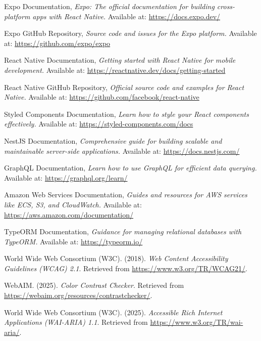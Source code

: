\begin{thebibliography}{99}

Expo Documentation,  
\textit{Expo: The official documentation for building cross-platform apps with React Native.}  
Available at: \url{https://docs.expo.dev/}

Expo GitHub Repository,  
\textit{Source code and issues for the Expo platform.}  
Available at: \url{https://github.com/expo/expo}

React Native Documentation,  
\textit{Getting started with React Native for mobile development.}  
Available at: \url{https://reactnative.dev/docs/getting-started}

React Native GitHub Repository,  
\textit{Official source code and examples for React Native.}  
Available at: \url{https://github.com/facebook/react-native}

Styled Components Documentation,  
\textit{Learn how to style your React components effectively.}  
Available at: \url{https://styled-components.com/docs}

NestJS Documentation,  
\textit{Comprehensive guide for building scalable and maintainable server-side applications.}  
Available at: \url{https://docs.nestjs.com/}

GraphQL Documentation,  
\textit{Learn how to use GraphQL for efficient data querying.}  
Available at: \url{https://graphql.org/learn/}

Amazon Web Services Documentation,  
\textit{Guides and resources for AWS services like ECS, S3, and CloudWatch.}  
Available at: \url{https://aws.amazon.com/documentation/}

TypeORM Documentation,  
\textit{Guidance for managing relational databases with TypeORM.}  
Available at: \url{https://typeorm.io/}

World Wide Web Consortium (W3C). (2018). \textit{Web Content Accessibility Guidelines (WCAG) 2.1}. Retrieved from \url{https://www.w3.org/TR/WCAG21/}.

WebAIM. (2025). \textit{Color Contrast Checker}. Retrieved from \url{https://webaim.org/resources/contrastchecker/}.

World Wide Web Consortium (W3C). (2025). \textit{Accessible Rich Internet Applications (WAI-ARIA) 1.1}. Retrieved from \url{https://www.w3.org/TR/wai-aria/}.


\end{thebibliography}
